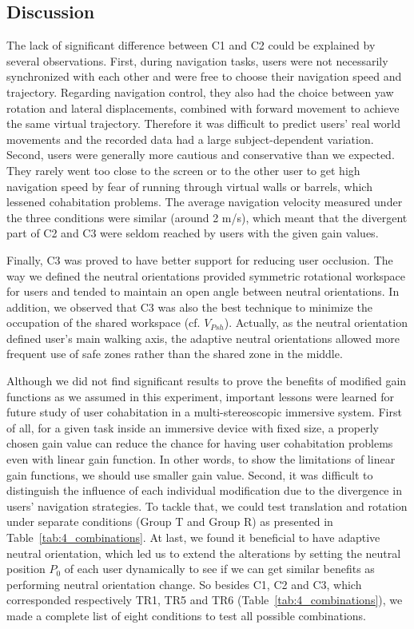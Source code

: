 \subsection{Discussion}
The lack of significant difference between C1 and C2 could be explained by several observations. First, during navigation tasks, users were not necessarily synchronized with each other and were free to choose their navigation speed and trajectory. Regarding navigation control, they also had the choice between yaw rotation and lateral displacements, combined with forward movement to achieve the same virtual trajectory. Therefore it was difficult to predict users' real world movements and the recorded data had a large subject-dependent variation. Second, users were generally more cautious and conservative than we expected. They rarely went too close to the screen or to the other user to get high navigation speed by fear of running through virtual walls or barrels, which lessened cohabitation problems. The average navigation velocity measured under the three conditions were similar (around 2 m/s), which meant that the divergent part of C2 and C3 were seldom reached by users with the given gain values.

Finally, C3 was proved to have better support for reducing user occlusion. The way we defined the neutral orientations provided symmetric rotational workspace for users and tended to maintain an open angle between neutral orientations. In addition, we observed that C3 was also the best technique to minimize the occupation of the shared workspace (cf. $V_{Psh}$). Actually, as the neutral orientation defined user's main walking axis, the adaptive neutral orientations allowed more frequent use of safe zones rather than the shared zone in the middle.

Although we did not find significant results to prove the benefits of modified gain functions as we assumed in this experiment, important lessons were learned for future study of user cohabitation in a multi-stereoscopic immersive system. First of all, for a given task inside an immersive device with fixed size, a properly chosen gain value can reduce the chance for having user cohabitation problems even with linear gain function. In other words, to show the limitations of linear gain functions, we should use smaller gain value. Second, it was difficult to distinguish the influence of each individual modification due to the divergence in users' navigation strategies. To tackle that, we could test translation and rotation under separate conditions (Group T and Group R) as presented in Table~\ref{tab:4_combinations}. At last, we found it beneficial to have adaptive neutral orientation, which led us to extend the alterations by setting the neutral position $P_{0}$ of each user dynamically to see if we can get similar benefits as performing neutral orientation change. So besides C1, C2 and C3, which corresponded respectively TR1, TR5 and TR6 (Table~\ref{tab:4_combinations}), we made a complete list of eight conditions to test all possible combinations.

